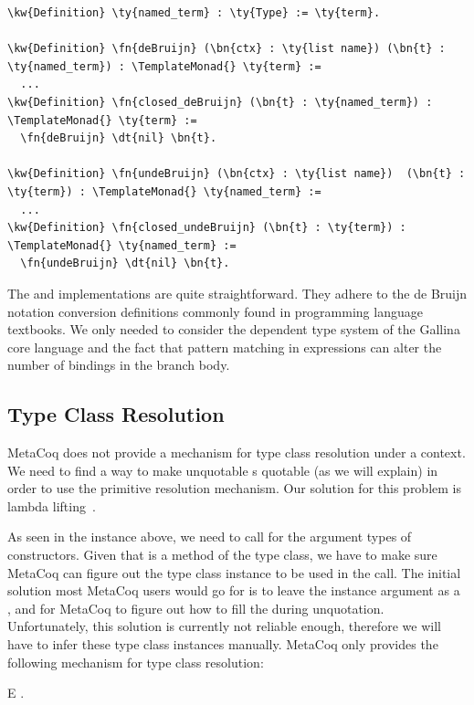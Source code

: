 \begin{Verbatim}
\kw{Definition} \ty{named_term} : \ty{Type} := \ty{term}.

\kw{Definition} \fn{deBruijn} (\bn{ctx} : \ty{list name}) (\bn{t} : \ty{named_term}) : \TemplateMonad{} \ty{term} :=
  ...
\kw{Definition} \fn{closed_deBruijn} (\bn{t} : \ty{named_term}) : \TemplateMonad{} \ty{term} :=
  \fn{deBruijn} \dt{nil} \bn{t}.

\kw{Definition} \fn{undeBruijn} (\bn{ctx} : \ty{list name})  (\bn{t} : \ty{term}) : \TemplateMonad{} \ty{named_term} :=
  ...
\kw{Definition} \fn{closed_undeBruijn} (\bn{t} : \ty{term}) : \TemplateMonad{} \ty{named_term} :=
  \fn{undeBruijn} \dt{nil} \bn{t}.
\end{Verbatim}

The  and  implementations are quite straightforward. They adhere to the de Bruijn notation conversion definitions commonly found in programming language textbooks. We only needed to consider the dependent type system of the \gls{Gallina} core language and the fact that pattern matching in  expressions can alter the number of bindings in the branch body.

\subsection{Type Class Resolution}

MetaCoq does not provide a mechanism for type class resolution under a context. We need to find a way to make unquotable s quotable (as we will explain) in order to use the \gls{primitive} resolution mechanism. Our solution for this problem is lambda lifting~\cite{johnsson1985lambda}. 

As seen in the \GraphPredicatevec{} instance above, we need to call \graphpredicate{} for the argument types of constructors. Given that \graphpredicate{} is a method of the \GraphPredicate{} type class, we have to make sure MetaCoq can figure out the type class instance to be used in the call. The initial solution most MetaCoq users would go for is to leave the instance argument as a , and for MetaCoq to figure out how to fill the  during \gls{unquotation}. Unfortunately, this solution is currently not reliable enough, therefore we will have to infer these type class instances manually. MetaCoq only provides the following mechanism for type class resolution:

\vspace{.2in}
\begin{SaveVerbatim}{E}
 .
\end{SaveVerbatim}

